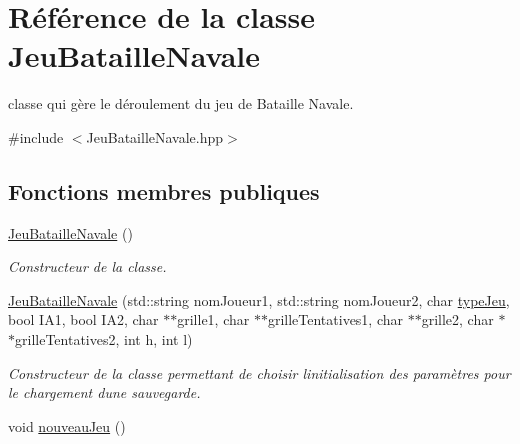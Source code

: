 \hypertarget{class_jeu_bataille_navale}{}\section{Référence de la classe Jeu\+Bataille\+Navale}
\label{class_jeu_bataille_navale}


classe qui gère le déroulement du jeu de Bataille Navale.  




{\ttfamily \#include $<$Jeu\+Bataille\+Navale.\+hpp$>$}

\subsection*{Fonctions membres publiques}
\begin{DoxyCompactItemize}
\item 
\hyperlink{class_jeu_bataille_navale_aae41366decd137f03ac95aff8b8e0f49}{Jeu\+Bataille\+Navale} ()\hypertarget{class_jeu_bataille_navale_aae41366decd137f03ac95aff8b8e0f49}{}\label{class_jeu_bataille_navale_aae41366decd137f03ac95aff8b8e0f49}

\begin{DoxyCompactList}\small\item\em Constructeur de la classe. \end{DoxyCompactList}\item 
\hyperlink{class_jeu_bataille_navale_a6d12c52e4d69ab4a9d8dc6945cda7be4}{Jeu\+Bataille\+Navale} (std\+::string nom\+Joueur1, std\+::string nom\+Joueur2, char \hyperlink{class_jeu_bataille_navale_abac1f29d41caf119a9766f323506dbe0}{type\+Jeu}, bool I\+A1, bool I\+A2, char $\ast$$\ast$grille1, char $\ast$$\ast$grille\+Tentatives1, char $\ast$$\ast$grille2, char $\ast$$\ast$grille\+Tentatives2, int h, int l)\hypertarget{class_jeu_bataille_navale_a6d12c52e4d69ab4a9d8dc6945cda7be4}{}\label{class_jeu_bataille_navale_a6d12c52e4d69ab4a9d8dc6945cda7be4}

\begin{DoxyCompactList}\small\item\em Constructeur de la classe permettant de choisir l\textquotesingle{}initialisation des paramètres pour le chargement d\textquotesingle{}une sauvegarde. \end{DoxyCompactList}\item 
void \hyperlink{class_jeu_bataille_navale_a3f59d8ee46918984df4a13cd261d5491}{nouveau\+Jeu} ()\hypertarget{class_jeu_bataille_navale_a3f59d8ee46918984df4a13cd261d5491}{}\label{class_jeu_bataille_navale_a3f59d8ee46918984df4a13cd261d5491}


\end{DoxyCompactItemize}
